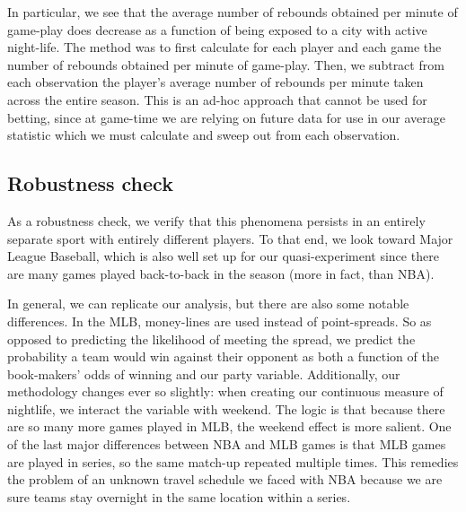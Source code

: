 \documentclass[letterpaper,12pt]{article}
\begin{document}
In particular, we see that the average number of rebounds obtained per minute
of game-play does decrease as a function of being exposed to a city with active night-life.
The method was to first calculate for each player and each game the number of rebounds obtained
per minute of game-play. Then, we subtract from each observation the player's average number of rebounds per minute taken across the entire season.
This is an ad-hoc approach that cannot be used for betting, since at game-time we are relying on future data for use in our average statistic which we must calculate and sweep out from each observation.


\subsection{Robustness check}
As a robustness check, we verify that this phenomena persists in an entirely separate
sport with entirely different players. To that end, we look toward
Major League Baseball, which is also well set up for our quasi-experiment since
there are many games played back-to-back in the season (more in fact, than NBA).

In general, we can replicate our analysis, but there are also some notable differences.
In the MLB, money-lines
are used instead of point-spreads. So as opposed to predicting
the likelihood of meeting the spread, we predict the probability
a team would win against their opponent as both a function of the book-makers'
odds of winning and our party variable. 
Additionally, our methodology changes ever so slightly: when creating our
continuous measure of nightlife, we interact the variable with weekend. The logic
is that because there are so many more games played in MLB, the weekend effect is more salient.
One of the last major differences between NBA and MLB games is that MLB games
are played in series, so the same match-up repeated multiple times. This remedies
the problem of an unknown travel schedule we faced with NBA because we are sure 
teams stay overnight in the same location within a series.
\end{document}
